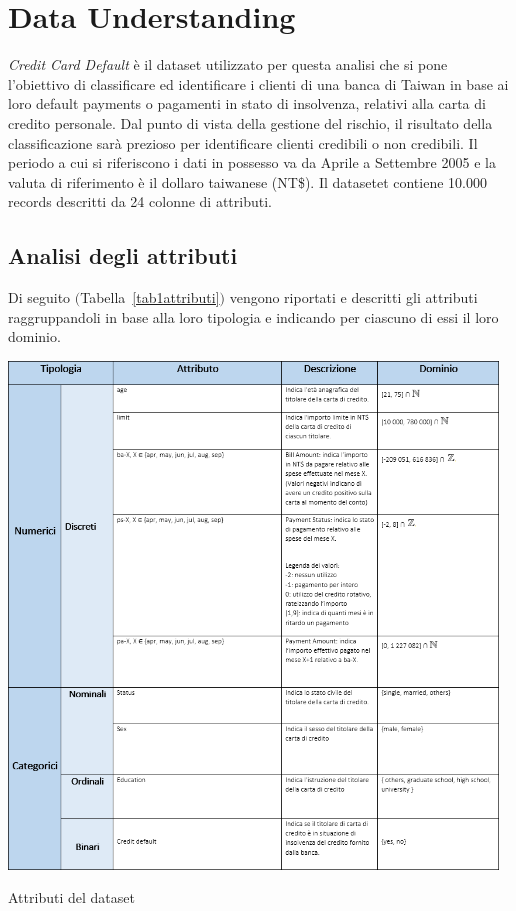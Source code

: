 \chapter{Data Understanding}

\textit{Credit Card Default} è il dataset utilizzato per questa analisi che si pone l'obiettivo di classificare ed identificare i clienti di una banca di Taiwan in base ai loro default payments o pagamenti in stato di insolvenza, relativi alla carta di credito personale. Dal punto di vista della gestione del rischio, il risultato della classificazione sarà prezioso per identificare clienti credibili o non credibili. Il periodo a cui si riferiscono i dati in possesso va da Aprile a Settembre 2005 e la valuta di riferimento è il dollaro taiwanese (NT\$). Il datasetet contiene 10.000 records descritti da 24 colonne di attributi.

\section{Analisi degli attributi}

Di seguito $($Tabella~\ref{tab1attributi}$)$ vengono riportati e descritti gli attributi raggruppandoli in base alla loro tipologia e indicando per ciascuno di essi il loro dominio.
\begin{table}[H]
	\centering
	\includegraphics[width=13cm]{img/tabella1-attributi.png}
	\caption[LOF entry]{Attributi del dataset}
	\label{tab1attributi}
\end{table} 

